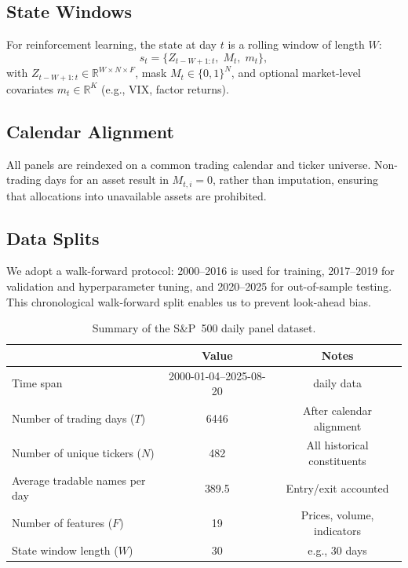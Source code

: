 \documentclass[10pt,leqno]{amsart}
\begin{document}
\subsection{State Windows}
For reinforcement learning, the state at day $t$ is a rolling window of length $W$:
\[
s_t = \{ Z_{t-W+1:t},\; M_t,\; m_t \},
\]
with $Z_{t-W+1:t} \in \mathbb{R}^{W \times N \times F}$, mask $M_t \in \{0,1\}^N$, and optional market-level covariates $m_t \in \mathbb{R}^K$ (e.g., VIX, factor returns).

\subsection{Calendar Alignment}
All panels are reindexed on a common trading calendar and ticker universe. Non-trading days for an asset result in $M_{t,i}=0$, rather than imputation, ensuring that allocations into unavailable assets are prohibited.

\subsection{Data Splits}
We adopt a walk-forward protocol: 2000--2016 is used for training, 2017--2019 for validation and hyperparameter tuning, and 2020--2025 for out-of-sample testing. This chronological walk-forward split enables us to prevent look-ahead bias.


\begin{table}[h!]
\centering
\caption{Summary of the S\&P~500 daily panel dataset.}
\label{tab:data_summary}
\begin{tabular}{lcc}
\hline
 & Value & Notes \\
\hline
Time span & 2000-01-04--2025-08-20 & daily data \\
Number of trading days ($T$) & 6446 & After calendar alignment \\
Number of unique tickers ($N$) & 482 & All historical constituents \\
Average tradable names per day & 389.5 & Entry/exit accounted \\
Number of features ($F$) & 19 & Prices, volume, indicators \\
State window length ($W$) & 30 & e.g., 30 days \\
\hline
\end{tabular}
\end{table}
\end{document}
